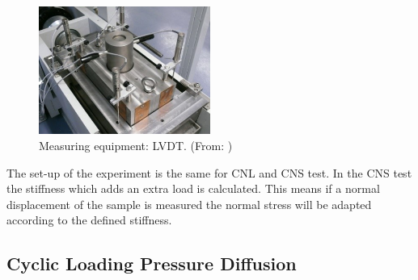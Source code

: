 \begin{figure}[!ht]
\begin{center}
\includegraphics[width=0.5\textwidth]{./figures/ExpCNLLVDT.jpg}
\end{center}
\caption{Measuring equipment: LVDT. (From: \cite{Nguyen2014})}
\label{fig:ExpCNLLVDT}
\end{figure}

The set-up of the experiment is the same for CNL and CNS test. In the CNS test the stiffness which adds an extra load is calculated. This means if a normal displacement of the sample is measured the normal stress will be adapted according to the defined stiffness.


\subsection{Cyclic Loading Pressure Diffusion}

